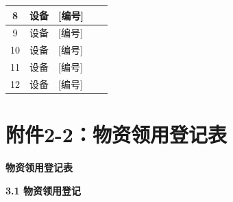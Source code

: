 \documentclass[UTF8,10pt,a4paper,fontset=fandol]{ctexart}
\newcommand{\fieldvalue}[1]{#1}
\newcommand{\handwritten}[1]{#1}
\begin{document}
\begin{table}[h]
\begin{tabularx}{\textwidth}{|c|X|X|X|c|}
\\
\hline
8 &
设备 &
\fieldvalue{\handwritten{[编号]}} &
\fieldvalue{\handwritten{\checkmark}} &
\\
\hline
9 &
设备 &
\fieldvalue{\handwritten{[编号]}} &
\fieldvalue{\handwritten{\checkmark}} &
\\
\hline
10 &
设备 &
\fieldvalue{\handwritten{[编号]}} &
\fieldvalue{\handwritten{\checkmark}} &
\\
\hline
11 &
设备 &
\fieldvalue{\handwritten{[编号]}} &
\fieldvalue{\handwritten{\checkmark}} &
\\
\hline
12 &
设备 &
\fieldvalue{\handwritten{[编号]}} &
\fieldvalue{\handwritten{\checkmark}} &
\\
\hline
\end{tabularx}
\end{table}


\newpage

\section*{附件2-2：物资领用登记表}

\begin{center}
\textbf{物资领用登记表}
\end{center}

\noindent
\textbf{3.1 物资领用登记}
\end{document}
